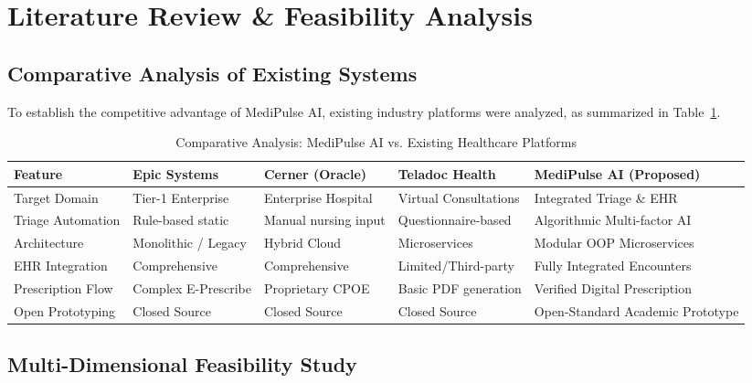 \documentclass[11pt,a4paper]{article}
\begin{document}
\section{Literature Review \& Feasibility Analysis}

\subsection{Comparative Analysis of Existing Systems}
To establish the competitive advantage of MediPulse AI, existing industry platforms were analyzed, as summarized in Table~\ref{tab:comp_analysis}.

\begin{table}[H]
\centering
\caption{Comparative Analysis: MediPulse AI vs. Existing Healthcare Platforms}
\label{tab:comp_analysis}
\small
\begin{tabularx}{\textwidth}{lXXXX}
\toprule
\textbf{Feature} & \textbf{Epic Systems} & \textbf{Cerner (Oracle)} & \textbf{Teladoc Health} & \textbf{MediPulse AI (Proposed)} \\
\midrule
Target Domain & Tier-1 Enterprise & Enterprise Hospital & Virtual Consultations & Integrated Triage \& EHR \\
Triage Automation & Rule-based static & Manual nursing input & Questionnaire-based & Algorithmic Multi-factor AI \\
Architecture & Monolithic / Legacy & Hybrid Cloud & Microservices & Modular OOP Microservices \\
EHR Integration & Comprehensive & Comprehensive & Limited/Third-party & Fully Integrated Encounters \\
Prescription Flow & Complex E-Prescribe & Proprietary CPOE & Basic PDF generation & Verified Digital Prescription \\
Open Prototyping & Closed Source & Closed Source & Closed Source & Open-Standard Academic Prototype \\
\bottomrule
\end{tabularx}
\end{table}

\subsection{Multi-Dimensional Feasibility Study}
\end{document}
